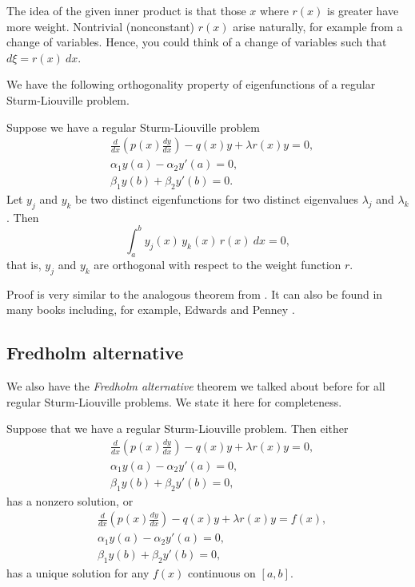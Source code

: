 \documentclass[12pt]{book}
\begin{document}
The idea of the given inner product is that those $x$ where $r(x)$
is greater have more weight.
Nontrivial (nonconstant)
$r(x)$ arise naturally, for example from a change of variables.
Hence, you could
think of a change of variables such that $d\xi = r(x)~ dx$.

We have the following orthogonality property of eigenfunctions of a
regular Sturm-Liouville problem.

\begin{theorem}
Suppose we have a regular Sturm-Liouville problem
\begin{align*}
&\frac{d}{dx} \left( p(x) \frac{dy}{dx} \right)
- q(x) y + \lambda r(x) y = 0 , \\
&\alpha_1 y(a) - \alpha_2 y'(a) = 0 , \\
&\beta_1 y(b) + \beta_2 y'(b) = 0 .
\end{align*}
Let $y_j$ and $y_k$ be two distinct eigenfunctions for two
distinct eigenvalues $\lambda_j$ and $\lambda_k$.  Then
\begin{equation*}
\int_a^b y_j(x) \, y_k(x) \, r(x) ~dx = 0,
\end{equation*}
that is, $y_j$ and $y_k$ are orthogonal with respect to the weight function
$r$.
\end{theorem}

Proof is very similar to the analogous theorem from .
It can also be found in many books including, for example,
Edwards and Penney \cite{EP}.

\subsection{Fredholm alternative}

We also have the \emph{Fredholm alternative} theorem we talked about before
for all regular Sturm-Liouville problems.  We state it here for completeness.

\begin{theorem}%
Suppose that we have a regular Sturm-Liouville problem.
Then either
\begin{align*}
&\frac{d}{dx} \left( p(x) \frac{dy}{dx} \right)
- q(x) y + \lambda r(x) y = 0 , \\
&\alpha_1 y(a) - \alpha_2 y'(a) = 0 , \\
&\beta_1 y(b) + \beta_2 y'(b) = 0 ,
\end{align*}
has a nonzero solution, or
\begin{align*}
&\frac{d}{dx} \left( p(x) \frac{dy}{dx} \right)
- q(x) y + \lambda r(x) y = f(x) , \\
&\alpha_1 y(a) - \alpha_2 y'(a) = 0 , \\
&\beta_1 y(b) + \beta_2 y'(b) = 0 ,
\end{align*}
has a unique solution for any $f(x)$ continuous on $[a,b]$.
\end{theorem}
\end{document}
